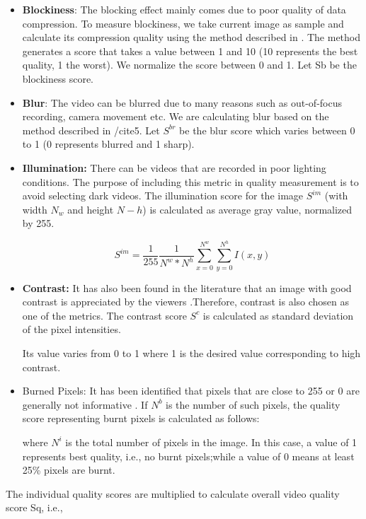 \documentclass{sig-alternate}
\begin{document}
\begin{itemize}
    \item \textbf{Blockiness}: The blocking effect mainly comes due to poor quality of data compression. To measure blockiness, we take current image as sample and calculate its compression quality using the method described in \cite{18}. The method generates a score that takes a value between 1 and 10 (10 represents the best quality, 1 the worst). We normalize the score between 0 and 1. Let Sb be the blockiness score.
    \item \textbf{Blur}: The video can be blurred due to many reasons such as out-of-focus recording, camera movement etc. We are calculating blur based on the method described in /cite{5}. Let $S^{br}$ be the blur score which varies between 0 to 1 (0 represents blurred and 1 sharp).
    \item \textbf{Illumination:} There can be videos that are recorded in poor lighting conditions. The purpose of including this metric in quality measurement is to avoid selecting dark videos. The illumination score for the image $S^{im}$ (with width $N_w$ and height $N-h$) is calculated as average gray value, normalized by 255.

    \begin{equation}
    S^{im} = \frac{1}{255}\frac{1}{N^w*N^h}\sum_{x=0}^{N^w}\sum_{y=0}^{N^h}I(x,y)
\end{equation}

    \item \textbf{Contrast:} It has also been found in the literature that an image with good contrast is appreciated by the viewers \cite{10}.Therefore, contrast is also chosen as one of the metrics. The contrast score $S^c$ is calculated as standard deviation of the pixel intensities.

    Its value varies from 0 to 1 where 1 is the desired value corresponding to high contrast.
    \item Burned Pixels: It has been identified that pixels that are close to 255 or 0 are generally not informative \cite{15}. If $N^b$ is the number of such pixels, the quality score representing burnt pixels is calculated as follows:

    where $N^i$ is the total number of pixels in the image. In this case, a value of 1 represents best quality, i.e., no burnt pixels;while a value of 0 means at least 25\% pixels are burnt.

    
    
\end{itemize}
The individual quality scores are multiplied to calculate overall video quality score Sq, i.e.,
\end{document}
